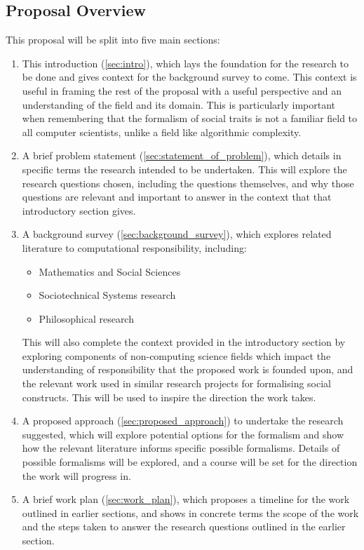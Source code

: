 \subsection{Proposal Overview}\label{subsec:overview}
This proposal will be split into five main sections:\\
\begin{enumerate}
    \item This introduction (\cref{sec:intro}), which lays the foundation for the research to be done and gives context for the background survey to come.\newline
        This context is useful in framing the rest of the proposal with a useful perspective and an understanding of the field and its domain. This is particularly important when remembering that the formalism of social traits is not a familiar field to all computer scientists, unlike a field like algorithmic complexity.
    \item A brief problem statement (\cref{sec:statement_of_problem}), which details in specific terms the research intended to be undertaken. \newline
        This will explore the research questions chosen, including the questions themselves, and why those questions are relevant and important to answer in the context that that introductory section gives.
    \item A background survey (\cref{sec:background_survey}), which explores related literature to computational responsibility, including:\\
        \begin{itemize}
            \item Mathematics and Social Sciences
            \item Sociotechnical Systems research
            \item Philosophical research
        \end{itemize}
        This will also complete the context provided in the introductory section by exploring components of non-computing science fields which impact the understanding of responsibility that the proposed work is founded upon, and the relevant work used in similar research projects for formalising social constructs. This will be used to inspire the direction the work takes.
    \item A proposed approach (\cref{sec:proposed_approach}) to undertake the research suggested, which will explore potential options for the formalism and show how the relevant literature informs specific possible formalisms. \newline
        Details of possible formalisms will be explored, and a course will be set for the direction the work will progress in.
    \item A brief work plan (\cref{sec:work_plan}), which proposes a timeline for the work outlined in earlier sections, and shows in concrete terms the scope of the work and the steps taken to answer the research questions outlined in the earlier section.
\end{enumerate}

